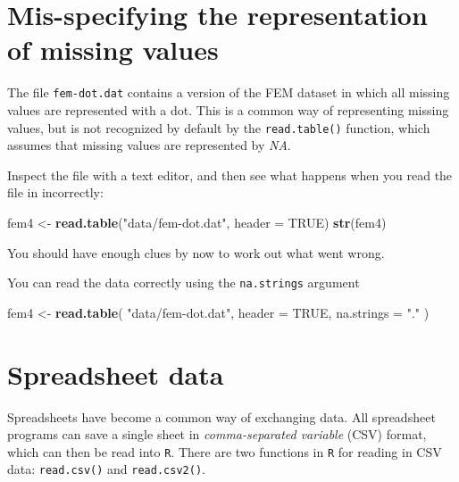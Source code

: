 \documentclass[
]{book}
\newenvironment{Shaded}{\begin{snugshade}}{\end{snugshade}}
\newcommand{\AttributeTok}[1]{\textcolor[rgb]{0.13,0.29,0.53}{#1}}
\newcommand{\ConstantTok}[1]{\textcolor[rgb]{0.56,0.35,0.01}{#1}}
\newcommand{\FunctionTok}[1]{\textcolor[rgb]{0.13,0.29,0.53}{\textbf{#1}}}
\newcommand{\NormalTok}[1]{#1}
\newcommand{\OtherTok}[1]{\textcolor[rgb]{0.56,0.35,0.01}{#1}}
\newcommand{\StringTok}[1]{\textcolor[rgb]{0.31,0.60,0.02}{#1}}
\begin{document}
\section{Mis-specifying the representation of missing values}\label{mis-specifying-the-representation-of-missing-values}

The file \texttt{fem-dot.dat} contains a version of the FEM dataset in
which all missing values are represented with a dot. This is a common
way of representing missing values, but is not recognized by default
by the \texttt{read.table()} function, which assumes that missing values
are represented by \emph{NA}.

Inspect the file with a text editor, and then see what happens when
you read the file in incorrectly:

\begin{Shaded}
\begin{Highlighting}[]
\NormalTok{fem4 }\OtherTok{\textless{}{-}} \FunctionTok{read.table}\NormalTok{(}\StringTok{"data/fem{-}dot.dat"}\NormalTok{, }\AttributeTok{header =} \ConstantTok{TRUE}\NormalTok{)}
\FunctionTok{str}\NormalTok{(fem4)}
\end{Highlighting}
\end{Shaded}

You should have enough clues by now to work out what went wrong.

You can read the data correctly using the \texttt{na.strings} argument

\begin{Shaded}
\begin{Highlighting}[]
\NormalTok{fem4 }\OtherTok{\textless{}{-}} 
  \FunctionTok{read.table}\NormalTok{(}
    \StringTok{"data/fem{-}dot.dat"}\NormalTok{, }
    \AttributeTok{header =} \ConstantTok{TRUE}\NormalTok{, }
    \AttributeTok{na.strings =} \StringTok{"."}
\NormalTok{  )}
\end{Highlighting}
\end{Shaded}

\section{Spreadsheet data}\label{spreadsheet-data}

Spreadsheets have become a common way of exchanging data. All
spreadsheet programs can save a single sheet in \emph{comma-separated
variable} (CSV) format, which can then be read into \texttt{R}. There
are two functions in \texttt{R} for reading in CSV data:
\texttt{read.csv()} and \texttt{read.csv2()}.
\end{document}
